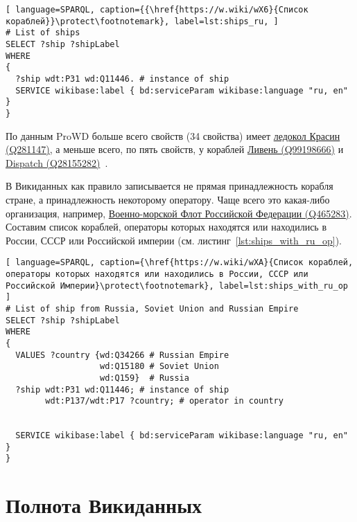 \begin{lstlisting}[ language=SPARQL, caption={{\href{https://w.wiki/wX6}{Список кораблей}}\protect\footnotemark}, label=lst:ships_ru, ]
# List of ships
SELECT ?ship ?shipLabel
WHERE
{
  ?ship wdt:P31 wd:Q11446. # instance of ship
  SERVICE wikibase:label { bd:serviceParam wikibase:language "ru, en" }
}
\end{lstlisting}

По данным ProWD больше всего свойств (34 свойства) имеет \href{https://www.wikidata.org/wiki/Q281147}{ледокол Красин (Q281147)}, а меньше всего, по пять свойств, у кораблей \href{https://www.wikidata.org/wiki/Q99198666}{Ливень (Q99198666)} и \href{https://www.wikidata.org/wiki/Q28155282}{Dispatch (Q28155282)}~\cite{ProWD_ru_ships}.

В Викиданных как правило записывается не прямая принадлежность корабля стране, а принадлежность некоторому оператору. Чаще всего это какая-либо организация, например, \href{https://www.wikidata.org/wiki/Q465283}{Военно-морской Флот Российской Федерации (Q465283)}. Составим список кораблей, операторы которых находятся или находились в России, СССР или Российской империи (см. листинг~\ref{lst:ships_with_ru_op}).

\begin{lstlisting}[ language=SPARQL, caption={\href{https://w.wiki/wXA}{Cписок кораблей, операторы которых находятся или находились в России, СССР или Российской Империи}\protect\footnotemark}, label=lst:ships_with_ru_op ]
# List of ship from Russia, Soviet Union and Russian Empire
SELECT ?ship ?shipLabel
WHERE
{
  VALUES ?country {wd:Q34266 # Russian Empire
                   wd:Q15180 # Soviet Union
                   wd:Q159}  # Russia
  ?ship wdt:P31 wd:Q11446; # instance of ship
        wdt:P137/wdt:P17 ?country; # operator in country
    

  SERVICE wikibase:label { bd:serviceParam wikibase:language "ru, en" }
}
\end{lstlisting}


\section{Полнота Викиданных}

